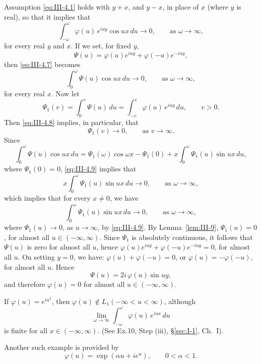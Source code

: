 Assumption \eqref{eq:III-4.1} holds with $y+x$, and $y-x$, in place of $x$ (where $y$ is real), so that it implies that
\begin{equation}\tag{4.7}\label{eq:III-4.7}
\int_{-\omega}^{\omega}\varphi(u)\,e^{iuy}\cos ux\,du\to0,\qquad\text{as }\omega\to\infty,
\end{equation}
for every real $y$ and $x$. If we set, for fixed $y$,
\[
\Psi(u)=\varphi(u)e^{iuy}+\varphi(-u)e^{-iuy},
\]
then \eqref{eq:III-4.7} becomes
\begin{equation}\tag{4.8}\label{eq:III-4.8}
\int_{0}^{\omega}\Psi(u)\cos ux\,du\to0,\qquad\text{as }\omega\to\infty,
\end{equation}
for every real $x$. Now let
\[
\Psi_{1}(v)=\int_{0}^{v}\Psi(u)\,du=\int_{-v}^{v}\varphi(u)\,e^{iuy}\,du,\qquad v>0.
\]
Then \eqref{eq:III-4.8} implies, in particular, that
\begin{equation}\tag{4.9}\label{eq:III-4.9}
\Psi_{1}(v)\to0,\qquad\text{as }v\to\infty.
\end{equation}
Since
\[
\int_{0}^{\omega}\Psi(u)\cos ux\,du
=\Psi_{1}(\omega)\cos\omega x-\Psi_{1}(0)+x\int_{0}^{\omega}\Psi_{1}(u)\sin ux\,du,
\]
where $\Psi_{1}(0)=0$, \eqref{eq:III-4.9} implies that
\[
x\int_{0}^{\omega}\Psi_{1}(u)\sin ux\,du\to0,\qquad\text{as }\omega\to\infty,
\]
which implies that for every $x\neq0$, we have
\[
\int_{0}^{\omega}\Psi_{1}(u)\sin ux\,du\to0,\qquad\text{as }\omega\to\infty,
\]
where $\Psi_{1}(u)\to0$, as $u\to\infty$, by \eqref{eq:III-4.9}. By Lemma~\ref{lem:III-9}, $\Psi_{1}(u)=0$, for almost all $u\in(-\infty,\infty)$. Since $\Psi_{1}$ is absolutely continuous, it follows that $\Psi(u)$ is zero for almost all $u$, hence $\varphi(u)e^{iuy}+\varphi(-u)e^{-iuy}=0$, for almost all $u$. On setting $y=0$, we have: $\varphi(u)+\varphi(-u)=0$, or $\varphi(u)=-\varphi(-u)$, for almost all $u$. Hence
\[
\Psi(u)=2i\,\varphi(u)\sin uy,
\]
and therefore $\varphi(u)=0$ for almost all $u\in(-\infty,\infty)$.

\begin{remark}\label{rem:III-1}
If $\varphi(u)=e^{iu^{2}}$, then $\varphi(u)\notin L_{1}(-\infty<u<\infty)$, although
\[
\lim_{\omega\to\infty}\int_{-\omega}^{\omega}\varphi(u)\,e^{iux}\,du
\]
is finite for all $x\in(-\infty,\infty)$. (See Ex.10, Step (iii), \S\ref{sec:I-1}, Ch.~I).

Another such example is provided by
\[
\varphi(u)=\exp(\alpha u+ie^{u}),\qquad0<\alpha<1.
\]
\end{remark}
